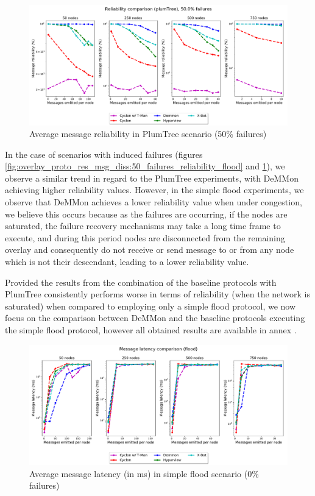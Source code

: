 \begin{figure}[htbp]
    \centering
    \includegraphics[width=\linewidth]{Chapters/evaluation/figures/flood/plumTree_50.0_failures_reliability.pdf}
    \caption{Average message reliability in PlumTree scenario (50\% failures)}
    \label{fig:overlay_proto_res_msg_diss:50_failures_reliability_plumTree}
\end{figure}

In the case of scenarios with induced failures (figures \ref{fig:overlay_proto_res_msg_diss:50_failures_reliability_flood} and \ref{fig:overlay_proto_res_msg_diss:50_failures_reliability_plumTree}), we observe a similar trend in regard to the PlumTree experiments, with DeMMon achieving higher reliability values. However, in the simple flood experiments, we observe that DeMMon achieves a lower reliability value when under congestion, we believe this occurs because as the failures are occurring, if the nodes are saturated, the failure recovery mechanisms may take a long time frame to execute, and during this period nodes are disconnected from the remaining overlay and consequently do not receive or send message to or from any node which is not their descendant, leading to a lower reliability value.

Provided the results from the combination of the baseline protocols with PlumTree consistently performs worse in terms of reliability (when the network is saturated) when compared to employing only a simple flood protocol, we now focus on the comparison between DeMMon and the baseline protocols executing the simple flood protocol, however all obtained results are available in annex .

\begin{figure}[htbp]
    \centering
    \includegraphics[width=\linewidth]{Chapters/evaluation/figures/flood/flood_0.0_failures_msg_lat.pdf}
    \caption{Average message latency (in ms) in simple flood scenario (0\% failures)}
    \label{fig:overlay_proto_res_msg_diss:0_failures_latency_flood}
\end{figure}

